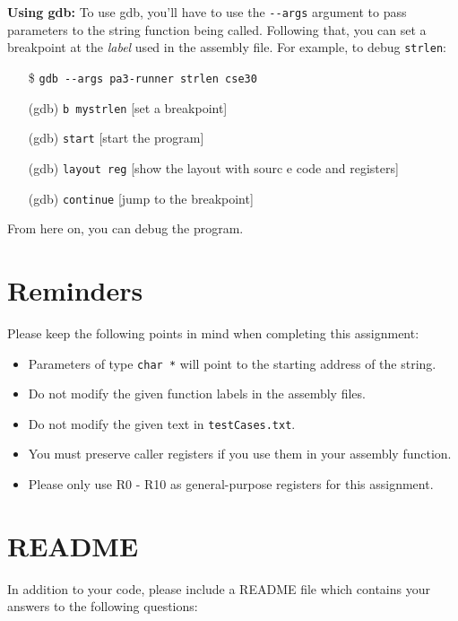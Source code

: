 \documentclass{article}
\begin{document}
\textbf{Using gdb:}
To use gdb, you'll have to use the \texttt{-{}-args} argument to pass parameters to the string function being called. Following that, you can set a breakpoint at the \textit{label} used in the assembly file. For example, to debug \texttt{strlen}:
\begin{itemize}
\item[\$]\texttt{gdb -{}-args pa3-runner strlen cse30}
\item[(gdb)]\texttt{b mystrlen} \hspace{10mm} [set a breakpoint]
\item[(gdb)]\texttt{start}  \hspace{19mm}   [start the program]
\item[(gdb)]\texttt{layout reg} \hspace{10mm} [show the layout with sourc e code and registers]
\item[(gdb)]\texttt{continue} \hspace{14mm}  [jump to the breakpoint]
\end{itemize}
From here on, you can debug the program.
\section{Reminders}
Please keep the following points in mind when completing this assignment:
\begin{itemize}
    \item Parameters of type {\tt char *} will point to the starting address of the string.
    \item Do not modify the given function labels in the assembly files.
    \item Do not modify the given text in {\tt testCases.txt}.
    \item You must preserve caller registers if you use them in your assembly function.
    \item Please only use R0 - R10 as general-purpose registers for this assignment.
    
\end{itemize}

\section{README}

In addition to your code, please include a README file which contains your
answers to the following questions:
\end{document}
